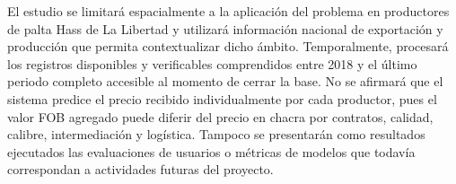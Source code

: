El estudio se limitará espacialmente a la aplicación del problema en productores de palta Hass de La Libertad y utilizará información nacional de exportación y producción que permita contextualizar dicho ámbito. Temporalmente, procesará los registros disponibles y verificables comprendidos entre 2018 y el último periodo completo accesible al momento de cerrar la base. No se afirmará que el sistema predice el precio recibido individualmente por cada productor, pues el valor FOB agregado puede diferir del precio en chacra por contratos, calidad, calibre, intermediación y logística. Tampoco se presentarán como resultados ejecutados las evaluaciones de usuarios o métricas de modelos que todavía correspondan a actividades futuras del proyecto.

